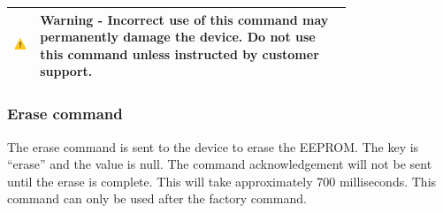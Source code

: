 
\newcommand{\warning}{
    \begin{center}
        \begin{tabular}{ | m{0.06\linewidth} m{0.7\linewidth} | }
            \hline
            \includegraphics[scale=0.06]{Images/warning.png} & \textbf{Warning} - Incorrect use of this command may permanently damage the device.  Do not use this command unless instructed by customer support.\\
            \hline
        \end{tabular}
    \end{center}
}

\warning

\subsubsection{Erase command}

The erase command is sent to the device to erase the \ac{EEPROM}.  The key is \enquote{erase} and the value is null.  The command acknowledgement will not be sent until the erase is complete.  This will take approximately 700 milliseconds.  This command can only be used after the factory command.


